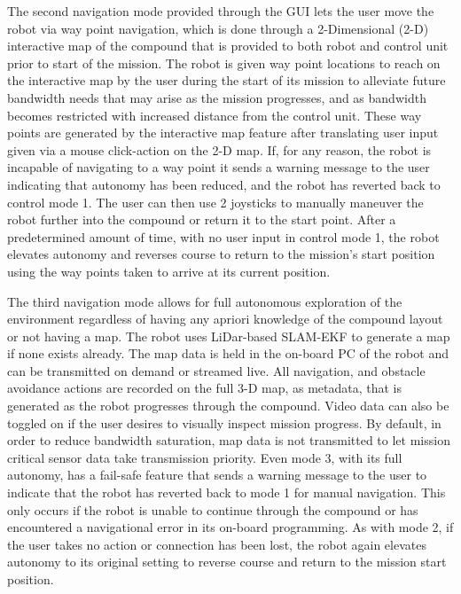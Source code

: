 The second navigation mode provided through the GUI lets the user move the robot via way point navigation, which is done through a 2-Dimensional (2-D) interactive map of the compound that is provided to both robot and control unit prior to start of the mission. The robot is given way point locations to reach on the interactive map by the user during the start of its mission to alleviate future bandwidth needs that may arise as the mission progresses, and as bandwidth becomes restricted with increased distance from the control unit. These way points are generated by the interactive map feature after translating user input given via a mouse click-action on the 2-D map. If, for any reason, the robot is incapable of navigating to a way point it sends a warning message to the user indicating that autonomy has been reduced, and the robot has reverted back to control mode 1. The user can then use 2 joysticks to manually  maneuver the robot further into the compound or return it to the start point. After a predetermined amount of time, with no user input in control mode 1, the robot elevates autonomy and reverses course to return to the mission's start position using the way points taken to arrive at its current position. 

The third navigation mode allows for full autonomous exploration of the environment regardless of having any apriori knowledge of the compound layout or not having a map. The robot uses LiDar-based SLAM-EKF to generate a map if none exists already. The map data is held in the on-board PC of the robot and can be transmitted on demand or streamed live. All navigation, and obstacle avoidance actions are recorded on the full 3-D map, as metadata, that is generated as the robot progresses through the compound. Video data can also be toggled on if the user desires to visually inspect mission progress. By default, in order to reduce bandwidth saturation, map data is not transmitted to let mission critical sensor data take transmission priority.  Even mode 3, with its full autonomy, has a fail-safe feature that sends a warning message to the user to indicate that the robot has reverted back to mode 1 for manual navigation. This only occurs if the robot is unable to continue through the compound or has encountered a navigational error in its on-board programming. As with mode 2, if the user takes no action or connection has been lost, the robot again elevates autonomy to its original setting to reverse course and return to the mission start position. 

